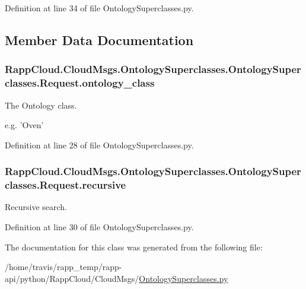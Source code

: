 Definition at line 34 of file Ontology\-Superclasses.\-py.



\subsection{Member Data Documentation}
\hypertarget{classRappCloud_1_1CloudMsgs_1_1OntologySuperclasses_1_1OntologySuperclasses_1_1Request_a6a65c01ddc46f07ed84911d3612355ad}{
\subsubsection[{ontology\-\_\-class}]{\setlength{\rightskip}{0pt plus 5cm}Rapp\-Cloud.\-Cloud\-Msgs.\-Ontology\-Superclasses.\-Ontology\-Superclasses.\-Request.\-ontology\-\_\-class}}\label{classRappCloud_1_1CloudMsgs_1_1OntologySuperclasses_1_1OntologySuperclasses_1_1Request_a6a65c01ddc46f07ed84911d3612355ad}


The Ontology class. 

e.\-g. 'Oven' 

Definition at line 28 of file Ontology\-Superclasses.\-py.

\hypertarget{classRappCloud_1_1CloudMsgs_1_1OntologySuperclasses_1_1OntologySuperclasses_1_1Request_a7f6046aa8399d9537e300efa49e0fe0f}{
\subsubsection[{recursive}]{\setlength{\rightskip}{0pt plus 5cm}Rapp\-Cloud.\-Cloud\-Msgs.\-Ontology\-Superclasses.\-Ontology\-Superclasses.\-Request.\-recursive}}\label{classRappCloud_1_1CloudMsgs_1_1OntologySuperclasses_1_1OntologySuperclasses_1_1Request_a7f6046aa8399d9537e300efa49e0fe0f}


Recursive search. 



Definition at line 30 of file Ontology\-Superclasses.\-py.



The documentation for this class was generated from the following file\-:\begin{DoxyCompactItemize}
\item 
/home/travis/rapp\-\_\-temp/rapp-\/api/python/\-Rapp\-Cloud/\-Cloud\-Msgs/\hyperlink{OntologySuperclasses_8py}{Ontology\-Superclasses.\-py}\end{DoxyCompactItemize}
